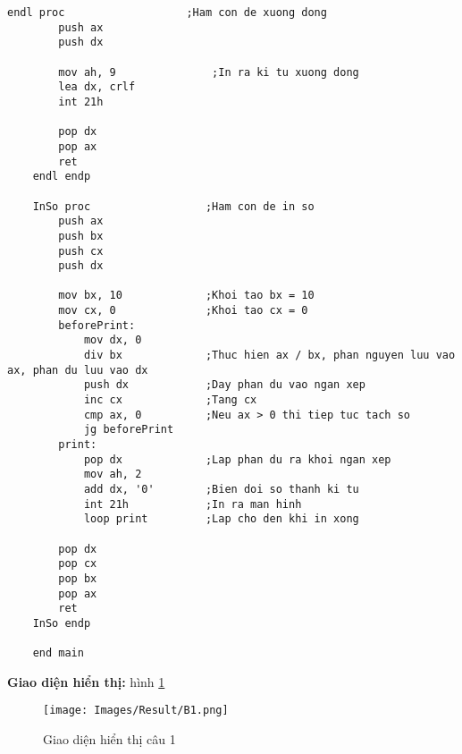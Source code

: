 \begin{lstlisting}[style=asm, caption={Mã nguồn câu 1}]
    endl proc                   ;Ham con de xuong dong
        push ax
        push dx
        
        mov ah, 9               ;In ra ki tu xuong dong
        lea dx, crlf
        int 21h
        
        pop dx
        pop ax
        ret
    endl endp  
    
    InSo proc                  ;Ham con de in so
        push ax
        push bx
        push cx
        push dx
        
        mov bx, 10             ;Khoi tao bx = 10
        mov cx, 0              ;Khoi tao cx = 0
        beforePrint:
            mov dx, 0
            div bx             ;Thuc hien ax / bx, phan nguyen luu vao ax, phan du luu vao dx
            push dx            ;Day phan du vao ngan xep
            inc cx             ;Tang cx 
            cmp ax, 0          ;Neu ax > 0 thi tiep tuc tach so
            jg beforePrint
        print:
            pop dx             ;Lap phan du ra khoi ngan xep
            mov ah, 2          
            add dx, '0'        ;Bien doi so thanh ki tu
            int 21h            ;In ra man hinh
            loop print         ;Lap cho den khi in xong
        
        pop dx
        pop cx
        pop bx
        pop ax
        ret
    InSo endp
    
    end main
\end{lstlisting}

\vspace{0.5cm}
\noindent\textbf{\large Giao diện hiển thị: } hình \ref{fig:result-1}

\begin{figure}[H]
    \centering
    \texttt{[image: Images/Result/B1.png]}
    \caption{Giao diện hiển thị câu 1}
    \label{fig:result-1}
\end{figure}